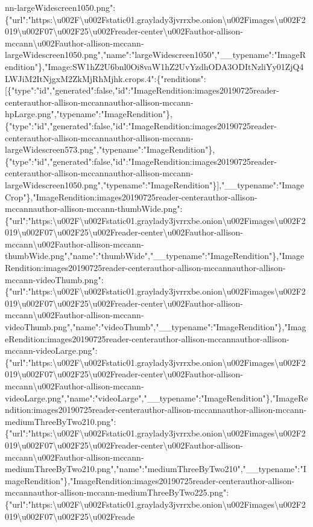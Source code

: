 nn-largeWidescreen1050.png":\{"url":"https:\textbackslash{}u002F\textbackslash{}u002Fstatic01.graylady3jvrrxbe.onion\textbackslash{}u002Fimages\textbackslash{}u002F2019\textbackslash{}u002F07\textbackslash{}u002F25\textbackslash{}u002Freader-center\textbackslash{}u002Fauthor-allison-mccann\textbackslash{}u002Fauthor-allison-mccann-largeWidescreen1050.png","name":"largeWidescreen1050","\_\_typename":"ImageRendition"\},"Image:SW1hZ2U6bnl0Oi8vaW1hZ2UvYzdhODA3ODItNzliYy01ZjQ4LWJiM2ItNjgxM2ZkMjRhMjhk.crops.4":\{"renditions":{[}\{"type":"id","generated":false,"id":"ImageRendition:images20190725reader-centerauthor-allison-mccannauthor-allison-mccann-hpLarge.png","typename":"ImageRendition"\},\{"type":"id","generated":false,"id":"ImageRendition:images20190725reader-centerauthor-allison-mccannauthor-allison-mccann-largeWidescreen573.png","typename":"ImageRendition"\},\{"type":"id","generated":false,"id":"ImageRendition:images20190725reader-centerauthor-allison-mccannauthor-allison-mccann-largeWidescreen1050.png","typename":"ImageRendition"\}{]},"\_\_typename":"ImageCrop"\},"ImageRendition:images20190725reader-centerauthor-allison-mccannauthor-allison-mccann-thumbWide.png":\{"url":"https:\textbackslash{}u002F\textbackslash{}u002Fstatic01.graylady3jvrrxbe.onion\textbackslash{}u002Fimages\textbackslash{}u002F2019\textbackslash{}u002F07\textbackslash{}u002F25\textbackslash{}u002Freader-center\textbackslash{}u002Fauthor-allison-mccann\textbackslash{}u002Fauthor-allison-mccann-thumbWide.png","name":"thumbWide","\_\_typename":"ImageRendition"\},"ImageRendition:images20190725reader-centerauthor-allison-mccannauthor-allison-mccann-videoThumb.png":\{"url":"https:\textbackslash{}u002F\textbackslash{}u002Fstatic01.graylady3jvrrxbe.onion\textbackslash{}u002Fimages\textbackslash{}u002F2019\textbackslash{}u002F07\textbackslash{}u002F25\textbackslash{}u002Freader-center\textbackslash{}u002Fauthor-allison-mccann\textbackslash{}u002Fauthor-allison-mccann-videoThumb.png","name":"videoThumb","\_\_typename":"ImageRendition"\},"ImageRendition:images20190725reader-centerauthor-allison-mccannauthor-allison-mccann-videoLarge.png":\{"url":"https:\textbackslash{}u002F\textbackslash{}u002Fstatic01.graylady3jvrrxbe.onion\textbackslash{}u002Fimages\textbackslash{}u002F2019\textbackslash{}u002F07\textbackslash{}u002F25\textbackslash{}u002Freader-center\textbackslash{}u002Fauthor-allison-mccann\textbackslash{}u002Fauthor-allison-mccann-videoLarge.png","name":"videoLarge","\_\_typename":"ImageRendition"\},"ImageRendition:images20190725reader-centerauthor-allison-mccannauthor-allison-mccann-mediumThreeByTwo210.png":\{"url":"https:\textbackslash{}u002F\textbackslash{}u002Fstatic01.graylady3jvrrxbe.onion\textbackslash{}u002Fimages\textbackslash{}u002F2019\textbackslash{}u002F07\textbackslash{}u002F25\textbackslash{}u002Freader-center\textbackslash{}u002Fauthor-allison-mccann\textbackslash{}u002Fauthor-allison-mccann-mediumThreeByTwo210.png","name":"mediumThreeByTwo210","\_\_typename":"ImageRendition"\},"ImageRendition:images20190725reader-centerauthor-allison-mccannauthor-allison-mccann-mediumThreeByTwo225.png":\{"url":"https:\textbackslash{}u002F\textbackslash{}u002Fstatic01.graylady3jvrrxbe.onion\textbackslash{}u002Fimages\textbackslash{}u002F2019\textbackslash{}u002F07\textbackslash{}u002F25\textbackslash{}u002Freade